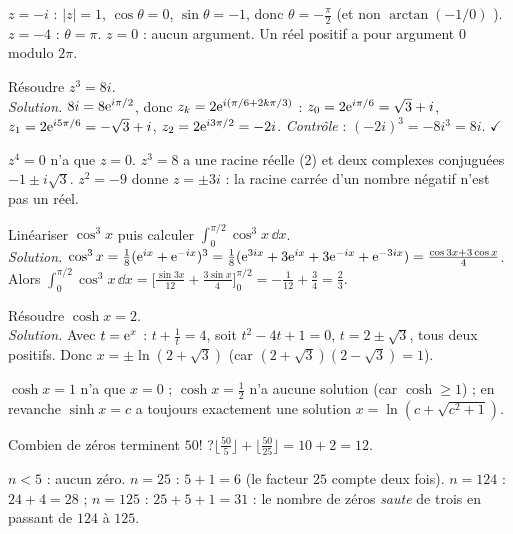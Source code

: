 \begin{cas}
$z=-i$ : $|z|=1$, $\cos\theta=0$, $\sin\theta=-1$, donc $\theta=-\frac\pi2$ (et non \og $\arctan(-1/0)$ \fg{}). $z=-4$ : $\theta=\pi$. $z=0$ : aucun argument. Un réel positif a pour argument $0$ modulo $2\pi$.
\end{cas}
\begin{exemple}
Résoudre $z^3=8i$.\\
\emph{Solution.} $8i=8\mathrm{e}^{i\pi/2}$, donc $z_k=2\mathrm{e}^{i(\pi/6+2k\pi/3)}$ : $z_0=2\mathrm{e}^{i\pi/6}=\sqrt3+i$, $z_1=2\mathrm{e}^{i5\pi/6}=-\sqrt3+i$, $z_2=2\mathrm{e}^{i3\pi/2}=-2i$. \emph{Contrôle} : $(-2i)^3=-8i^3=8i$. $\checkmark$
\end{exemple}
\begin{cas}
$z^4=0$ n'a que $z=0$. $z^3=8$ a une racine réelle ($2$) et deux complexes conjuguées $-1\pm i\sqrt3$. $z^2=-9$ donne $z=\pm3i$ : la \og racine carrée d'un nombre négatif \fg{} n'est pas un réel.
\end{cas}
\begin{exemple}
Linéariser $\cos^3x$ puis calculer $\int_0^{\pi/2}\cos^3x\,\dd x$.\\
\emph{Solution.} $\cos^3x=\frac18(\mathrm{e}^{ix}+\mathrm{e}^{-ix})^3=\frac18(\mathrm{e}^{3ix}+3\mathrm{e}^{ix}+3\mathrm{e}^{-ix}+\mathrm{e}^{-3ix})=\frac{\cos3x+3\cos x}4$. Alors $\int_0^{\pi/2}\cos^3x\,\dd x=\Big[\frac{\sin3x}{12}+\frac{3\sin x}4\Big]_0^{\pi/2}=-\frac1{12}+\frac34=\frac23$.
\end{exemple}
\begin{exemple}
Résoudre $\cosh x=2$.\\
\emph{Solution.} Avec $t=\mathrm{e}^x$ : $t+\frac1t=4$, soit $t^2-4t+1=0$, $t=2\pm\sqrt3$, tous deux positifs. Donc $x=\pm\ln(2+\sqrt3)$ (car $(2+\sqrt3)(2-\sqrt3)=1$).
\end{exemple}
\begin{cas}
$\cosh x=1$ n'a que $x=0$ ; $\cosh x=\frac12$ n'a aucune solution (car $\cosh\ge1$) ; en revanche $\sinh x=c$ a toujours exactement une solution $x=\ln(c+\sqrt{c^2+1})$.
\end{cas}
\begin{exemple}[zéros de $n!$]
Combien de zéros terminent $50!$ ?\quad $\lfloor\frac{50}5\rfloor+\lfloor\frac{50}{25}\rfloor=10+2=12$.
\end{exemple}
\begin{cas}[seuils]
$n<5$ : aucun zéro. $n=25$ : $5+1=6$ (le facteur $25$ compte deux fois). $n=124$ : $24+4=28$ ; $n=125$ : $25+5+1=31$ : le nombre de zéros \emph{saute} de trois en passant de $124$ à $125$.
\end{cas}

